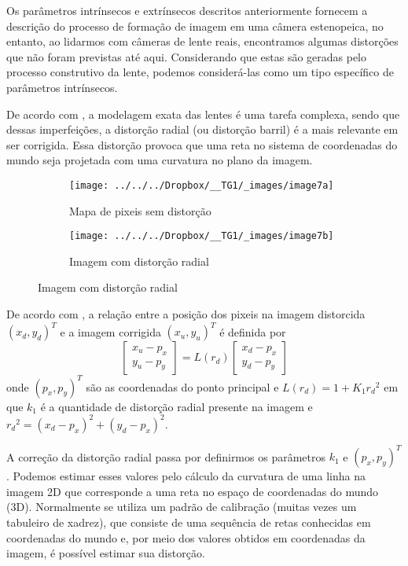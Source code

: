 \documentclass[ecp,tc]{iiufrgs}
\begin{document}
Os parâmetros intrínsecos e extrínsecos descritos anteriormente fornecem a descrição do processo de formação de imagem em uma câmera estenopeica, no entanto, ao lidarmos com câmeras de lente reais, encontramos algumas distorções que não foram previstas
até aqui. Considerando que estas são geradas pelo processo construtivo da lente, podemos considerá-las como um tipo específico de parâmetros intrínsecos.

De acordo com , a modelagem exata das lentes é uma tarefa complexa, sendo que dessas imperfeições, a distorção radial (ou distorção barril) é a mais relevante em ser corrigida. Essa distorção provoca que uma reta no sistema de coordenadas do mundo seja projetada com uma curvatura no plano da imagem.

\begin{figure}
	\centering
	\caption{Distorção radial}
	\begin{subfigure}[b]{0.4\textwidth}
		\texttt{[image: ../../../Dropbox/\_\_TG1/\_images/image7a]}
		\caption{Mapa de pixeis sem distorção}
		\label{fig:image7a}
	\end{subfigure}
	\quad
	\begin{subfigure}[b]{0.4\textwidth}
		\texttt{[image: ../../../Dropbox/\_\_TG1/\_images/image7b]}
		\caption{Imagem com distorção radial}
		\label{fig:image7b}
	\end{subfigure}
	\label{fig:image7}
\end{figure}

De acordo com , a relação entre a posição dos pixeis na imagem distorcida $ (x_d, y_d)^T $ e a imagem corrigida $ (x_u, y_u)^T $ é definida por
\[ \begin{bmatrix}x_u - p_x \\ y_u - p_y \end{bmatrix} = L(r_d)\begin{bmatrix}x_d - p_x \\ y_d - p_y \end{bmatrix}\]
onde $ (p_x, p_y)^T $ são as coordenadas do ponto principal e $ L(r_d) = 1+K_1{r_d}^2 $ em que $ k_1 $ é a quantidade de distorção radial presente na imagem e $ {r_d}^2 = (x_d - p_x)^2 + (y_d - p_x)^2 $.

A correção da distorção radial passa por definirmos os parâmetros $ k_1 $ e $ (p_x, p_y)^T $. Podemos estimar esses valores pelo cálculo da curvatura de uma linha na imagem 2D que corresponde a uma reta no espaço de coordenadas do mundo (3D). Normalmente se utiliza um padrão de calibração (muitas vezes um tabuleiro de xadrez), que consiste de uma sequência de retas conhecidas em coordenadas do mundo e, por meio dos valores obtidos em coordenadas da imagem, é possível estimar sua distorção.
\end{document}
